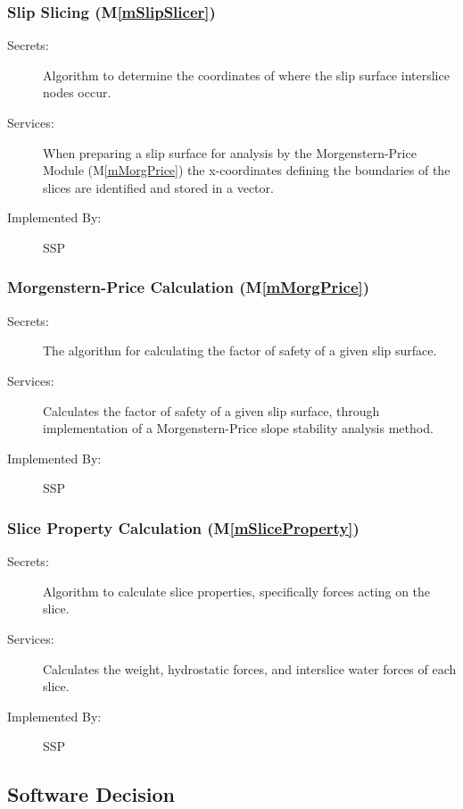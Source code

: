 \documentclass[12pt, titlepage]{article}
\newcommand{\progname}{SSP}
\newcommand{\mref}[1]{M\ref{#1}}
\begin{document}
\subsubsection{Slip Slicing (\mref{mSlipSlicer})}

\begin{description}
	\item[Secrets:] Algorithm to determine the coordinates of where the
	slip surface interslice nodes occur.
	\item[Services:] When preparing a slip surface for analysis by the
	Morgenstern-Price Module (\mref{mMorgPrice}) the x-coordinates defining the 
	boundaries of the slices are identified and stored in a vector.
	\item[Implemented By:] \progname
\end{description} 

\subsubsection{Morgenstern-Price Calculation (\mref{mMorgPrice})}

\begin{description}
\item[Secrets:] The algorithm for calculating the factor of safety of a given 
slip surface.
\item[Services:] Calculates the factor of safety of a given slip
  surface, through implementation of a Morgenstern-Price slope
  stability analysis method.
\item[Implemented By:] \progname
\end{description} 

\subsubsection{Slice Property Calculation (\mref{mSliceProperty})}
\begin{description}
\item[Secrets:] Algorithm to calculate slice properties, specifically forces 
acting on the slice. 
\item[Services:] Calculates the weight, hydrostatic forces, and interslice 
water forces of each slice.
\item[Implemented By:] \progname
\end{description} 


\subsection{Software Decision}
\end{document}
